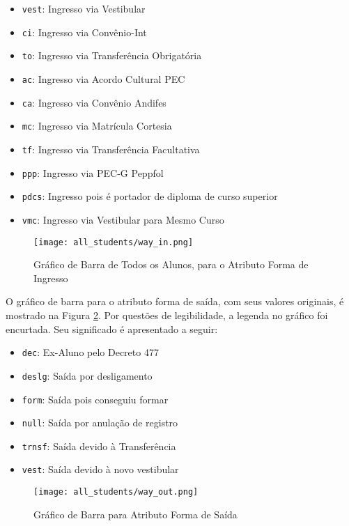    \begin{itemize}
    \item \texttt{vest}: Ingresso via Vestibular
    \item \texttt{ci}: Ingresso via Convênio-Int
    \item \texttt{to}: Ingresso via Transferência Obrigatória
    \item \texttt{ac}: Ingresso via Acordo Cultural PEC
    \item \texttt{ca}: Ingresso via Convênio Andifes
    \item \texttt{mc}: Ingresso via Matrícula Cortesia
    \item \texttt{tf}: Ingresso via Transferência Facultativa
    \item \texttt{ppp}: Ingresso via PEC-G Peppfol
    \item \texttt{pdcs}: Ingresso pois é portador de diploma de curso superior
    \item \texttt{vmc}: Ingresso via Vestibular para Mesmo Curso
    \end{itemize}

    \begin{figure}[!ht]
    \caption{Gráfico de Barra de Todos os Alunos, para o Atributo Forma de Ingresso}
    \centering
    \texttt{[image: all\_students/way\_in.png]}
    \label{atr_way_in_org}
    \end{figure}

O gráfico de barra para o atributo forma de saída, com seus valores originais, é
mostrado na Figura \ref{atr_way_out_org}. 
Por questões de legibilidade, a legenda no gráfico foi encurtada. Seu significado é
apresentado a seguir: 

    \begin{itemize}
    \item \texttt{dec}: Ex-Aluno pelo Decreto 477
    \item \texttt{deslg}: Saída por desligamento
    \item \texttt{form}: Saída pois conseguiu formar
    \item \texttt{null}: Saída por anulação de registro
    \item \texttt{trnsf}: Saída devido à Transferência
    \item \texttt{vest}: Saída devido à novo vestibular
    \end{itemize}

    \begin{figure}[!ht]
    \caption{Gráfico de Barra para Atributo Forma de Saída}
    \centering
    \texttt{[image: all\_students/way\_out.png]}
    \label{atr_way_out_org}
    \end{figure}


